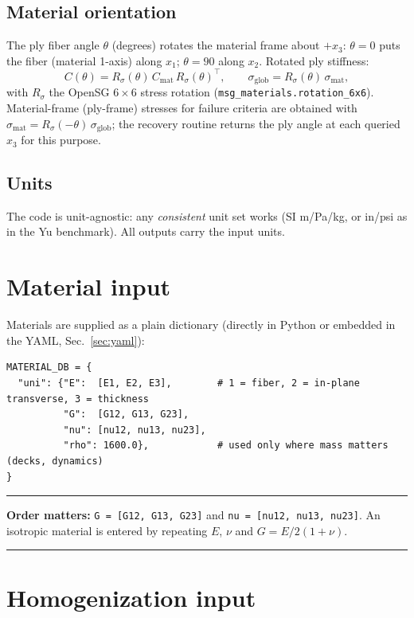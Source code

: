 \documentclass[11pt]{article}
\newcommand{\code}[1]{\texttt{#1}}
\newenvironment{keybox}%
{\par\medskip\noindent\begin{minipage}{\textwidth}\hrule\medskip}%
{\medskip\hrule\end{minipage}\medskip\par}
\begin{document}
\subsection{Material orientation}
The ply fiber angle $\theta$ (degrees) rotates the material frame
about $+x_3$: $\theta=0$ puts the fiber (material 1-axis) along
$x_1$; $\theta=90$ along $x_2$.  Rotated ply stiffness:
\[
C(\theta)=R_\sigma(\theta)\,C_{\text{mat}}\,R_\sigma(\theta)^{\!\top},
\qquad
\sigma_{\text{glob}}=R_\sigma(\theta)\,\sigma_{\text{mat}} ,
\]
with $R_\sigma$ the OpenSG $6\times6$ stress rotation
(\code{msg\_materials.rotation\_6x6}).  Material-frame (ply-frame)
stresses for failure criteria are obtained with
$\sigma_{\text{mat}}=R_\sigma(-\theta)\,\sigma_{\text{glob}}$; the
recovery routine returns the ply angle at each queried $x_3$ for this
purpose.

\subsection{Units}
The code is unit-agnostic: any \emph{consistent} unit set works
(SI m/Pa/kg, or in/psi as in the Yu benchmark).  All outputs carry
the input units.

\section{Material input}
Materials are supplied as a plain dictionary (directly in Python or
embedded in the YAML, Sec.~\ref{sec:yaml}):
\begin{verbatim}
MATERIAL_DB = {
  "uni": {"E":  [E1, E2, E3],        # 1 = fiber, 2 = in-plane transverse, 3 = thickness
          "G":  [G12, G13, G23],
          "nu": [nu12, nu13, nu23],
          "rho": 1600.0},            # used only where mass matters (decks, dynamics)
}
\end{verbatim}
\begin{keybox}
\textbf{Order matters:} \code{G = [G12, G13, G23]} and
\code{nu = [nu12, nu13, nu23]}.  An isotropic material is entered by
repeating $E$, $\nu$ and $G=E/2(1{+}\nu)$.
\end{keybox}

\section{Homogenization input}
\end{document}
